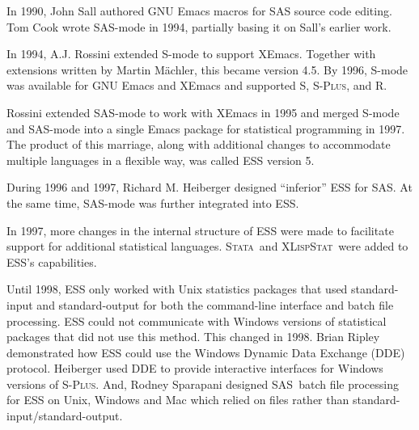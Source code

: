 \documentclass{article}
\newcommand*{\SAS}{\textsc{SAS}}
\newcommand*{\Splus}{\textsc{S-Plus}}
\newcommand*{\XLispStat}{\textsc{XLispStat}}
\newcommand*{\Stata}{\textsc{Stata}}
\newcommand{\stexttt}[1]{{\small\texttt{#1}}}
\begin{document}
In 1990, John Sall authored GNU Emacs macros for SAS source code 
editing.  Tom Cook wrote SAS-mode in 1994, partially basing it on 
Sall's earlier work.  

In 1994, A.J. Rossini extended S-mode to support XEmacs.  
Together with extensions written by Martin M{\"a}chler, this
became version 4.5.  By 1996, S-mode was available for GNU Emacs and
XEmacs and supported S, \Splus, and R.


Rossini extended SAS-mode to work with XEmacs in 1995 and merged S-mode 
and SAS-mode into a single Emacs package for statistical programming in 1997.  
The product of this marriage, along with additional changes to accommodate 
multiple languages in a flexible way, was called ESS version 5.

During 1996 and 1997, Richard M. Heiberger designed ``inferior'' ESS for \SAS.
At the same time, SAS-mode was further integrated into ESS.

In 1997, more changes in the internal structure of ESS were made to
facilitate support for additional statistical languages.   \Stata\
and \XLispStat\ were added to ESS's capabilities.

Until 1998, ESS only worked with Unix statistics packages that
used standard-input and standard-output for both the command-line 
interface and batch file processing.  ESS could not communicate 
with Windows versions of statistical packages that did not use this 
method.  This changed in 1998.  Brian Ripley demonstrated how ESS 
could use the Windows Dynamic Data Exchange (DDE) protocol.  
Heiberger used DDE to provide interactive interfaces for Windows 
versions of \Splus.  And, Rodney Sparapani designed \SAS\ batch file 
processing for ESS on Unix, Windows and Mac which relied on files 
rather than standard-input/standard-output.
\end{document}
